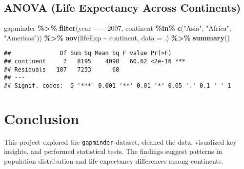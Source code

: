 \documentclass[
]{article}
\newenvironment{Shaded}{\begin{snugshade}}{\end{snugshade}}
\newcommand{\AttributeTok}[1]{\textcolor[rgb]{0.13,0.29,0.53}{#1}}
\newcommand{\DecValTok}[1]{\textcolor[rgb]{0.00,0.00,0.81}{#1}}
\newcommand{\FunctionTok}[1]{\textcolor[rgb]{0.13,0.29,0.53}{\textbf{#1}}}
\newcommand{\NormalTok}[1]{#1}
\newcommand{\SpecialCharTok}[1]{\textcolor[rgb]{0.81,0.36,0.00}{\textbf{#1}}}
\newcommand{\StringTok}[1]{\textcolor[rgb]{0.31,0.60,0.02}{#1}}
\begin{document}
\subsection{ANOVA (Life Expectancy Across
Continents)}\label{anova-life-expectancy-across-continents}

\begin{Shaded}
\begin{Highlighting}[]
\NormalTok{gapminder }\SpecialCharTok{\%\textgreater{}\%} 
  \FunctionTok{filter}\NormalTok{(year }\SpecialCharTok{==} \DecValTok{2007}\NormalTok{, continent }\SpecialCharTok{\%in\%} \FunctionTok{c}\NormalTok{(}\StringTok{"Asia"}\NormalTok{, }\StringTok{"Africa"}\NormalTok{, }\StringTok{"Americas"}\NormalTok{)) }\SpecialCharTok{\%\textgreater{}\%} 
  \FunctionTok{aov}\NormalTok{(lifeExp }\SpecialCharTok{\textasciitilde{}}\NormalTok{ continent, }\AttributeTok{data =}\NormalTok{ .) }\SpecialCharTok{\%\textgreater{}\%}
  \FunctionTok{summary}\NormalTok{()}
\end{Highlighting}
\end{Shaded}

\begin{verbatim}
##              Df Sum Sq Mean Sq F value Pr(>F)    
## continent     2   8195    4098   60.62 <2e-16 ***
## Residuals   107   7233      68                   
## ---
## Signif. codes:  0 '***' 0.001 '**' 0.01 '*' 0.05 '.' 0.1 ' ' 1
\end{verbatim}

\section{Conclusion}\label{conclusion}

This project explored the \texttt{gapminder} dataset, cleaned the data,
visualized key insights, and performed statistical tests. The findings
suggest patterns in population distribution and life expectancy
differences among continents.
\end{document}
